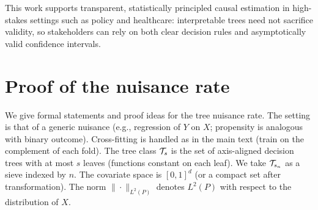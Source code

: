 \documentclass[12pt]{article}
\begin{document}
This work supports transparent, statistically principled causal estimation in high-stakes settings such as policy and healthcare: interpretable trees need not sacrifice validity, so stakeholders can rely on both clear decision rules and asymptotically valid confidence intervals.

\appendix
\section{Proof of the nuisance rate}
\label{app:nuisance-rate}

We give formal statements and proof ideas for the tree nuisance rate. The setting is that of a generic nuisance (e.g., regression of $Y$ on $X$; propensity is analogous with binary outcome). Cross-fitting is handled as in the main text (train on the complement of each fold). The tree class $\mathcal{T}_s$ is the set of axis-aligned decision trees with at most $s$ leaves (functions constant on each leaf). We take $\mathcal{T}_{s_n}$ as a sieve indexed by $n$. The covariate space is $[0,1]^d$ (or a compact set after transformation). The norm $\|\cdot\|_{L^2(P)}$ denotes $L^2(P)$ with respect to the distribution of $X$.
\end{document}
